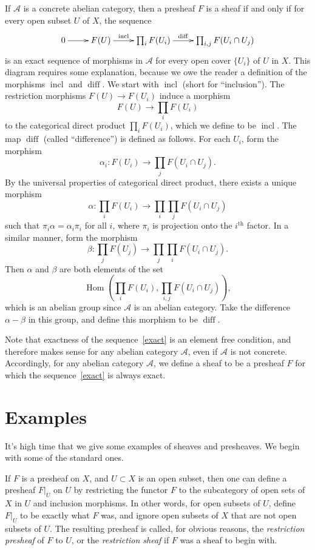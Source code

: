 \documentclass[12pt]{article}
\newcommand{\A}{\mathcal{A}}
\newcommand{\diff}{\operatorname{diff}}
\newcommand{\incl}{\operatorname{incl}}
\newcommand{\Hom}{\operatorname{Hom}}
\begin{document}
If $\A$ is a concrete abelian category, then a presheaf $F$ is a sheaf
if and only if for every open subset $U$ of $X$, the sequence
\begin{equation}\label{exact}
\xymatrix{
0 \ar[r] & F(U) \ar[r]^-{\incl} & \prod_i F(U_i) \ar[r]^-{\diff} &
\prod_{i,j} F(U_i \cap U_j)
}
\end{equation}
is an exact sequence of morphisms in $\A$ for every open cover
$\{U_i\}$ of $U$ in $X$. This diagram requires some explanation,
because we owe the reader a definition of the morphisms $\incl$ and
$\diff$. We start with $\incl$ (short for ``inclusion''). The
restriction morphisms $F(U) \to F(U_i)$ induce a morphism
$$
F(U) \to \prod_i F(U_i)
$$
to the categorical direct product $\prod_i F(U_i)$, which we define
to be $\incl$. The map $\diff$ (called ``difference'') is defined as
follows. For each $U_i$, form the morphism
$$
\alpha_i\colon F(U_i) \to \prod_j F(U_i \cap U_j).
$$
By the universal properties of categorical direct product, there
exists a unique morphism
$$
\alpha\colon \prod_i F(U_i) \to \prod_i \prod_j F(U_i \cap U_j)
$$
such that $\pi_i \alpha = \alpha_i \pi_i$ for all $i$, where $\pi_i$
is projection onto the $i^\text{th}$ factor. In a similar manner, form
the morphism
$$
\beta\colon \prod_j F(U_j) \to \prod_j \prod_i F(U_i \cap U_j).
$$
Then $\alpha$ and $\beta$ are both elements of the set
$$
\Hom\left(\prod_i F(U_i), \prod_{i,j} F(U_i \cap U_j)\right),
$$
which is an abelian group since
$\A$ is an abelian category. Take the difference $\alpha - \beta$ in
this group, and define this morphism to be $\diff$.

Note that exactness of the sequence~\eqref{exact} is an element free
condition, and therefore makes sense for any abelian category $\A$,
even if $\A$ is not concrete. Accordingly, for any abelian category
$\A$, we define a sheaf to be a presheaf $F$ for which the
sequence~\eqref{exact} is always exact.

\section{Examples}

It's high time that we give some examples of sheaves and
presheaves. We begin with some of the standard ones.

\begin{example}
If $F$ is a presheaf on $X$, and $U \subset X$ is an open subset, then
one can define a presheaf $F|_U$ on $U$ by restricting the functor $F$
to the subcategory of open sets of $X$ in $U$ and inclusion
morphisms. In other words, for open subsets of $U$, define $F|_U$ to
be exactly what $F$ was, and ignore open subsets of $X$ that are not
open subsets of $U$. The resulting presheaf is called, for obvious
reasons, the \emph{restriction presheaf} of $F$ to $U$, or the \emph{restriction sheaf} if $F$ was a sheaf to begin with.
\end{example}
\end{document}
